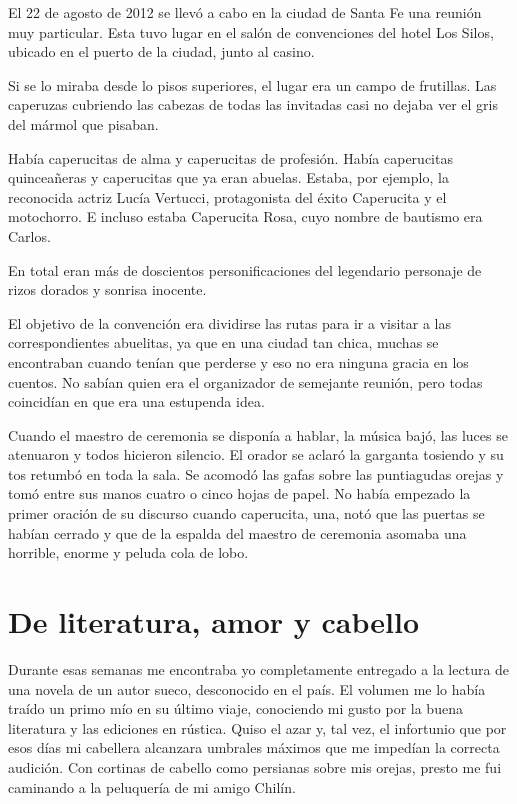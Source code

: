 \documentclass[11pt,twoside,openright,a6paper]{book}
\begin{document}
El 22 de agosto de 2012 se llevó a cabo en la ciudad de Santa Fe una reunión muy particular. Esta tuvo lugar en el salón de convenciones del hotel Los Silos, ubicado en el puerto de la ciudad, junto al casino.

Si se lo miraba desde lo pisos superiores, el lugar era un campo de frutillas. Las caperuzas cubriendo las cabezas de todas las invitadas casi no dejaba ver el gris del mármol que pisaban.

Había caperucitas de alma y caperucitas de profesión. Había caperucitas quinceañeras y caperucitas que ya eran abuelas.
Estaba, por ejemplo, la reconocida actriz Lucía Vertucci, protagonista del éxito Caperucita y el motochorro. E incluso estaba Caperucita Rosa, cuyo nombre de bautismo era Carlos.

En total eran más de doscientos personificaciones del legendario personaje de rizos dorados y sonrisa inocente.

El objetivo de la convención era dividirse las rutas para ir a visitar a las correspondientes abuelitas, ya que en una ciudad tan chica, muchas se encontraban cuando tenían que perderse y eso no era ninguna gracia en los cuentos. No sabían quien era el organizador de semejante reunión, pero todas coincidían en que era una estupenda idea.

Cuando el maestro de ceremonia se disponía a hablar, la música bajó, las luces se atenuaron y todos hicieron silencio. El orador se aclaró la garganta tosiendo y su tos retumbó en toda la sala. Se acomodó las gafas sobre las puntiagudas orejas y tomó entre sus manos cuatro o cinco hojas de papel. No había empezado la primer oración de su discurso cuando caperucita, una, notó que las puertas se habían cerrado y que de la espalda del maestro de ceremonia asomaba una horrible, enorme y peluda cola de lobo.

\chapter*{De literatura, amor y cabello}

Durante esas semanas me encontraba yo completamente entregado a la lectura de una novela de un autor sueco, desconocido en el país. El volumen me lo había traído un primo mío en su último viaje, conociendo mi gusto por la buena literatura y las ediciones en rústica. Quiso el azar y, tal vez, el infortunio que por esos días mi cabellera alcanzara umbrales máximos que me impedían la correcta audición. Con cortinas de cabello como persianas sobre mis orejas, presto me fui caminando a la peluquería de mi amigo Chilín.
\end{document}
